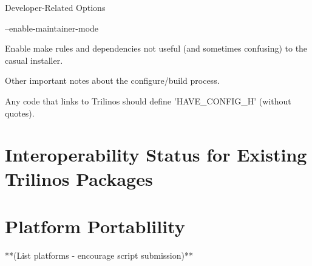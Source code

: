 \documentclass[12pt,relax]{TrilinosDevGuide}
\begin{document}
   Developer-Related Options

\bullet --enable-maintainer-mode 

Enable make rules and dependencies not useful (and sometimes confusing) to 
the casual installer.

\triangleright Other important notes about the configure/build process.

\circ Any code that links to Trilinos should define 'HAVE_CONFIG_H' (without
quotes).

	\chapter{Interoperability Status for Existing Trilinos Packages}

	\chapter{Platform Portablility}
	**(List platforms - encourage script submission)**
    \clearpage
    
    

\end{document}
